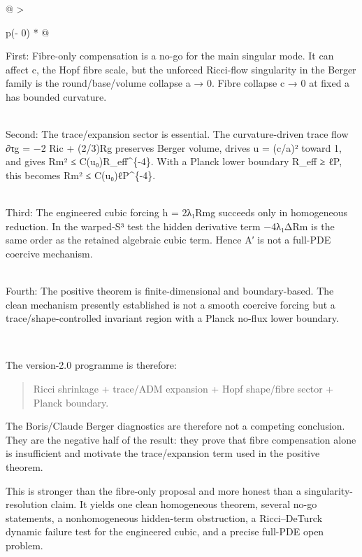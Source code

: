 \documentclass[
]{article}
\begin{document}
\begin{longtable}[]{@{}
  >{\raggedright\arraybackslash}p{(\columnwidth - 0\tabcolsep) * }@{}}
\toprule\noalign{}
\endhead
\bottomrule\noalign{}
\endlastfoot
\begin{minipage}[t]{\linewidth}\raggedright
First: Fibre-only compensation is a no-go for the main singular mode. It can affect c, the Hopf fibre scale, but the unforced Ricci-flow singularity in the Berger family is the round/base/volume collapse a → 0. Fibre collapse c → 0 at fixed a has bounded curvature.\\
\strut \\
Second: The trace/expansion sector is essential. The curvature-driven trace flow ∂τg = −2 Ric + (2/3)Rg preserves Berger volume, drives u = (c/a)² toward 1, and gives \textbar Rm\textbar² ≤ C(u₀)R\_eff\^{}\{-4\}. With a Planck lower boundary R\_eff ≥ ℓP, this becomes \textbar Rm\textbar² ≤ C(u₀)ℓP\^{}\{-4\}.\\
\strut \\
Third: The engineered cubic forcing h = 2λ₁\textbar Rm\textbar g succeeds only in homogeneous reduction. In the warped-S³ test the hidden derivative term −4λ₁Δ\textbar Rm\textbar{} is the same order as the retained algebraic cubic term. Hence A′ is not a full-PDE coercive mechanism.\\
\strut \\
Fourth: The positive theorem is finite-dimensional and boundary-based. The clean mechanism presently established is not a smooth coercive forcing but a trace/shape-controlled invariant region with a Planck no-flux lower boundary.\strut
\end{minipage} \\
\end{longtable}

The version-2.0 programme is therefore:

\begin{quote}
Ricci shrinkage + trace/ADM expansion + Hopf shape/fibre sector + Planck boundary.
\end{quote}

The Boris/Claude Berger diagnostics are therefore not a competing conclusion. They are the negative half of the result: they prove that fibre compensation alone is insufficient and motivate the trace/expansion term used in the positive theorem.

This is stronger than the fibre-only proposal and more honest than a singularity-resolution claim. It yields one clean homogeneous theorem, several no-go statements, a nonhomogeneous hidden-term obstruction, a Ricci--DeTurck dynamic failure test for the engineered cubic, and a precise full-PDE open problem.
\end{document}
